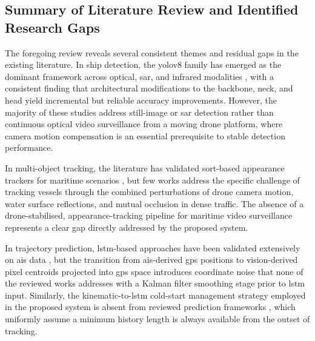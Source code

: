 \setlength{\parskip}{1em}


\subsection{Summary of Literature Review and Identified Research Gaps}

The foregoing review reveals several consistent themes and residual gaps in the
existing literature. In ship detection, the \gls{yolov8} family has emerged as the
dominant framework across optical, \gls{sar}, and infrared modalities
\cite{Ning2024, Gao2024, Gong2024, Chen2024, Yu2023, Liu2025, Fu2025,
Zhou2024, Yuan2024, Shi2025, Chen2023, Cao2024, Deshmukh2025, Caricchio2025},
with a consistent finding that architectural modifications to the backbone, neck,
and head yield incremental but reliable accuracy improvements. However, the
majority of these studies address still-image or \gls{sar} detection rather than
continuous optical video surveillance from a moving drone platform, where camera
motion compensation is an essential prerequisite to stable detection performance.

In multi-object tracking, the literature has validated \gls{sort}-based appearance
trackers for maritime scenarios \cite{Wang2025a, Muslim2025,
Belmouhcine2021, Belmouhcine2022}, but few works address the specific challenge
of tracking vessels through the combined perturbations of drone camera motion,
water surface reflections, and mutual occlusion in dense traffic. The absence
of a drone-stabilised, appearance-tracking pipeline for maritime video surveillance
represents a clear gap directly addressed by the proposed system.

In trajectory prediction, \gls{lstm}-based approaches have been validated extensively
on \gls{ais} data \cite{Capobianco2021, Yang2022, Chondrodima2023, Liu2022, Aouedi2026},
but the transition from \gls{ais}-derived \gls{gps} positions to vision-derived pixel centroids
projected into \gls{gps} space introduces coordinate noise that none of the reviewed
works addresses with a Kalman filter smoothing stage prior to \gls{lstm} input.
Similarly, the kinematic-to-\gls{lstm} cold-start management strategy employed in the
proposed system is absent from reviewed prediction frameworks
\cite{Zhang2022, Han2024, Nguyen2024, Zhang2024}, which uniformly assume a
minimum history length is always available from the outset of tracking.


